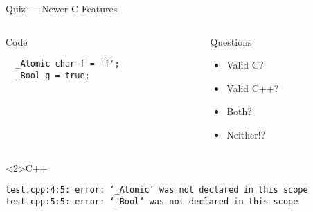\documentclass[presentation,aspectratio=169]{beamer}
\begin{document}
\begin{frame}[fragile,label={sec:org23c4234}]{Quiz — Newer C Features}
 \begin{columns}
\begin{column}{0.48\columnwidth}
\begin{block}{Code}
\begin{verbatim}
  _Atomic char f = 'f';
  _Bool g = true;
\end{verbatim}
\end{block}
\end{column}

\begin{column}{0.48\columnwidth}
\begin{block}{Questions}
\begin{itemize}
\item Valid C?
\item Valid C++?
\item Both?
\item Neither!?
\end{itemize}
\end{block}
\end{column}
\end{columns}

\begin{block}<2>{C++}
\begin{verbatim}
test.cpp:4:5: error: ‘_Atomic’ was not declared in this scope
test.cpp:5:5: error: ‘_Bool’ was not declared in this scope
\end{verbatim}
\end{block}
\end{frame}

\end{document}

